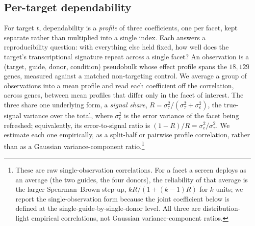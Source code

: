 \documentclass[11pt]{article}
\begin{document}
\subsection{Per-target dependability}

For target $t$, dependability is a \emph{profile} of three coefficients, one per
facet, kept separate rather than multiplied into a single index. Each answers a
reproducibility question: with everything else held fixed, how well does the
target's transcriptional signature repeat across a single facet? An observation is a
(target, guide, donor, condition) pseudobulk whose effect profile spans the
$18{,}129$ genes, measured against a matched non-targeting control. We average a
group of observations into a mean profile and read each coefficient off the
correlation, across genes, between mean profiles that differ only in the facet of
interest. The three share one underlying form, a \emph{signal share},
$R = \sigma^2_\tau/(\sigma^2_\tau + \sigma^2_e)$, the true-signal variance over the
total, where $\sigma^2_e$ is the error variance of the facet being refreshed;
equivalently, its error-to-signal ratio is $(1-R)/R = \sigma^2_e/\sigma^2_\tau$. We
estimate each one empirically, as a split-half or pairwise profile correlation,
rather than as a Gaussian variance-component ratio.\footnote{These are raw
single-observation correlations. For a facet a screen deploys as an average (the two
guides, the four donors), the reliability of that average is the larger
Spearman--Brown step-up, $kR/(1+(k-1)R)$ for $k$ units; we report the
single-observation form because the joint coefficient below is defined at the
single-guide-by-single-donor level. All three are distribution-light empirical
correlations, not Gaussian variance-component ratios.}
\end{document}
